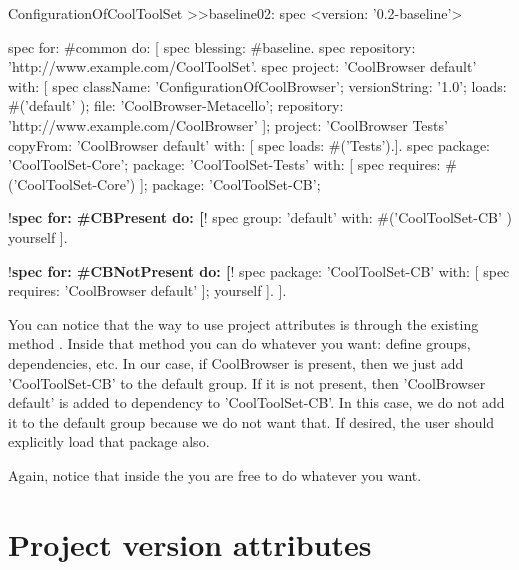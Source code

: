 \documentclass[a4paper,10pt,twoside]{book}
\begin{document}
\begin{code}{}
ConfigurationOfCoolToolSet >>baseline02: spec 
       <version: '0.2-baseline'>
       
       spec for: #common do: [
              spec blessing: #baseline.
              spec repository: 'http://www.example.com/CoolToolSet'.
              spec project: 'CoolBrowser default' with: [
                            spec
                                   className: 'ConfigurationOfCoolBrowser';
                                   versionString: '1.0';
                                   loads: #('default' );
                                   file: 'CoolBrowser-Metacello';
                                   repository: 'http://www.example.com/CoolBrowser' ];
                     project: 'CoolBrowser Tests' 
                            copyFrom: 'CoolBrowser default' 
                            with: [ spec loads: #('Tests').].
              spec 
                     package: 'CoolToolSet-Core';
                     package: 'CoolToolSet-Tests' with: [ 
                            spec requires: #('CoolToolSet-Core') ];
                     package: 'CoolToolSet-CB';       
                     
             !\textbf{spec for: \#CBPresent do: [}!   
                     spec
                            group: 'default' with: #('CoolToolSet-CB' )
                            yourself ].
              
             !\textbf{spec for: \#CBNotPresent do: [}!                 
                     spec 
                            package: 'CoolToolSet-CB' with: [ spec requires: 'CoolBrowser default' ];
                            yourself ].
                     ].
              
\end{code}

You can notice that the way to use project attributes is through the existing method . Inside that method you can do whatever you want: define groups, dependencies, etc. In our case, if CoolBrowser is present, then we just add 'CoolToolSet-CB' to the default group. If it is not present, then 'CoolBrowser default' is added to dependency to 'CoolToolSet-CB'. In this case, we do not add it to the default group because we do not want that. If desired, the user should explicitly load that package also. 

Again, notice that inside the  you are free to do whatever you want.

\section{Project version attributes}
 
\end{document}
